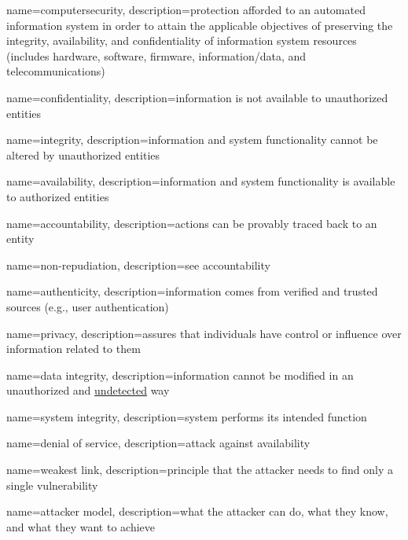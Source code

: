 
{
    name=computersecurity,
    description={protection afforded to an automated information system in order to attain the applicable objectives of preserving the \gls{integrity}, \gls{availability}, and \gls{confidentiality} of information system resources (includes hardware, software, firmware, information/data, and telecommunications)}
}

{
    name=confidentiality,
    description={information is not available to unauthorized entities}
}

{
    name=integrity,
    description={information and system functionality cannot be altered by unauthorized entities}
}

{
    name=availability,
    description={information and system functionality is available to authorized entities}
}

{
    name=accountability,
    description={actions can be provably traced back to an entity}
}

{
    name={non-repudiation},
    description={see \gls{accountability}}
}

{
    name={authenticity},
    description={information comes from verified and trusted sources (e.g., user authentication)}
}

{
    name={privacy},
    description={assures that individuals have control or influence over information related to them}
}

{
    name={data integrity},
    description={information cannot be modified in an unauthorized and \underline{undetected} way}
}


{
    name={system integrity},
    description={system performs its intended function}
}

{
    name={denial of service},
    description={attack against availability}
}

{
    name={weakest link},
    description={principle that the attacker needs to find only a single vulnerability}
}

{
    name={attacker model},
    description={what the attacker can do, what they know, and what they want to achieve}
}

